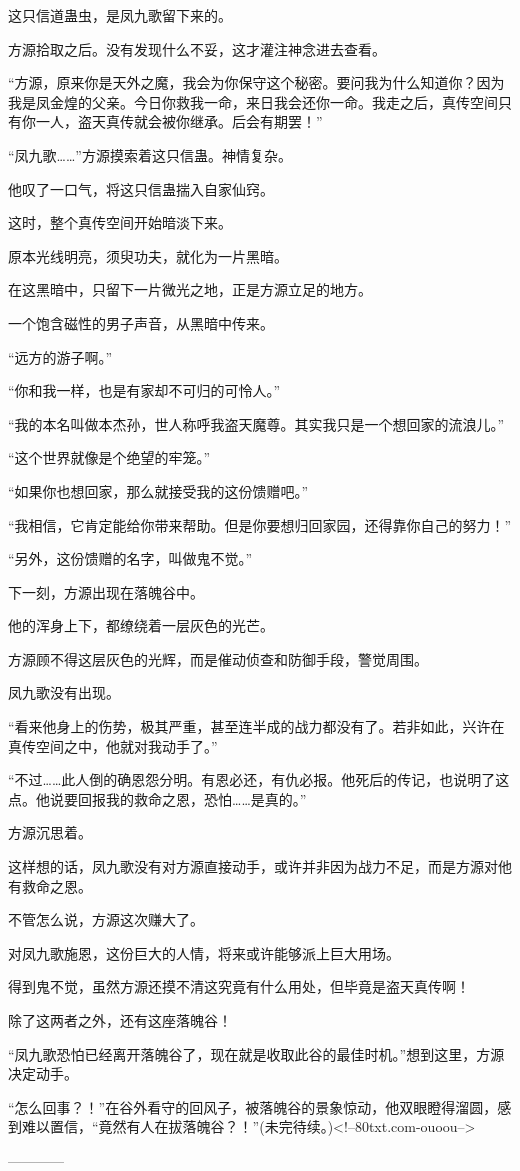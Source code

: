 \begin{this_body}
这只信道蛊虫，是凤九歌留下来的。

方源拾取之后。没有发现什么不妥，这才灌注神念进去查看。

“方源，原来你是天外之魔，我会为你保守这个秘密。要问我为什么知道你？因为我是凤金煌的父亲。今日你救我一命，来日我会还你一命。我走之后，真传空间只有你一人，盗天真传就会被你继承。后会有期罢！”

“凤九歌……”方源摸索着这只信蛊。神情复杂。

他叹了一口气，将这只信蛊揣入自家仙窍。

这时，整个真传空间开始暗淡下来。

原本光线明亮，须臾功夫，就化为一片黑暗。

在这黑暗中，只留下一片微光之地，正是方源立足的地方。

一个饱含磁性的男子声音，从黑暗中传来。

“远方的游子啊。”

“你和我一样，也是有家却不可归的可怜人。”

“我的本名叫做本杰孙，世人称呼我盗天魔尊。其实我只是一个想回家的流浪儿。”

“这个世界就像是个绝望的牢笼。”

“如果你也想回家，那么就接受我的这份馈赠吧。”

“我相信，它肯定能给你带来帮助。但是你要想归回家园，还得靠你自己的努力！”

“另外，这份馈赠的名字，叫做鬼不觉。”

下一刻，方源出现在落魄谷中。

他的浑身上下，都缭绕着一层灰色的光芒。

方源顾不得这层灰色的光辉，而是催动侦查和防御手段，警觉周围。

凤九歌没有出现。

“看来他身上的伤势，极其严重，甚至连半成的战力都没有了。若非如此，兴许在真传空间之中，他就对我动手了。”

“不过……此人倒的确恩怨分明。有恩必还，有仇必报。他死后的传记，也说明了这点。他说要回报我的救命之恩，恐怕……是真的。”

方源沉思着。

这样想的话，凤九歌没有对方源直接动手，或许并非因为战力不足，而是方源对他有救命之恩。

不管怎么说，方源这次赚大了。

对凤九歌施恩，这份巨大的人情，将来或许能够派上巨大用场。

得到鬼不觉，虽然方源还摸不清这究竟有什么用处，但毕竟是盗天真传啊！

除了这两者之外，还有这座落魄谷！

“凤九歌恐怕已经离开落魄谷了，现在就是收取此谷的最佳时机。”想到这里，方源决定动手。

“怎么回事？！”在谷外看守的回风子，被落魄谷的景象惊动，他双眼瞪得溜圆，感到难以置信，“竟然有人在拔落魄谷？！”(未完待续。)<!--80txt.com-ouoou-->

------------

\end{this_body}

